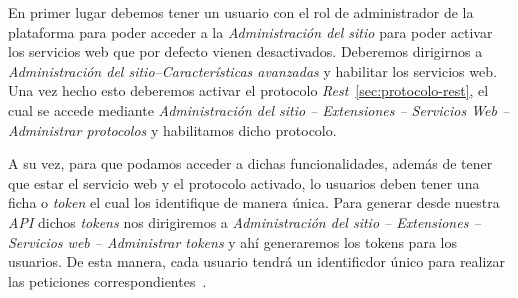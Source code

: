 En primer lugar debemos tener un usuario con el rol de administrador de la plataforma para poder acceder a la \textit{Administración del sitio} para poder activar los servicios web que por defecto vienen desactivados. Deberemos dirigirnos a \textit{Administración del sitio--Características avanzadas} y habilitar los servicios web. Una vez hecho esto deberemos activar el protocolo \textit{Rest}~\ref{sec:protocolo-rest}, el cual se accede mediante \textit{Administración del sitio -- Extensiones -- Servicios Web -- Administrar protocolos} y habilitamos dicho protocolo.

A su vez, para que podamos acceder a dichas funcionalidades, además de tener que estar el servicio web y el protocolo activado, lo usuarios deben tener una ficha o \textit{token} el cual los identifique de manera única. Para generar desde nuestra \textit{API} dichos \textit{tokens} nos dirigiremos a \textit{Administración del sitio -- Extensiones -- Servicios web -- Administrar tokens} y ahí generaremos los tokens para los usuarios. De esta manera, cada usuario tendrá un identificdor único para realizar las peticiones correspondientes~\cite{moodle:api-rest-config}.